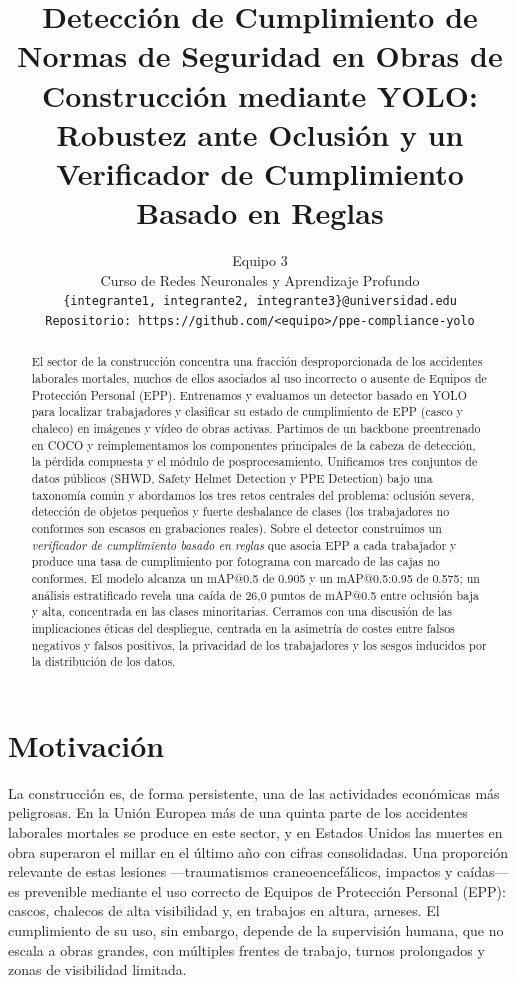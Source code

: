 \documentclass{article}
\title{Detección de Cumplimiento de Normas de Seguridad en Obras de\\
Construcción mediante YOLO: Robustez ante Oclusión y un\\
Verificador de Cumplimiento Basado en Reglas}
\author{%
  Equipo 3 \\
  Curso de Redes Neuronales y Aprendizaje Profundo \\
  \texttt{\{integrante1, integrante2, integrante3\}@universidad.edu} \\
  \texttt{Repositorio: https://github.com/<equipo>/ppe-compliance-yolo}
}
\begin{document}
\maketitle

\begin{abstract}
El sector de la construcción concentra una fracción desproporcionada de los
accidentes laborales mortales, muchos de ellos asociados al uso incorrecto o
ausente de Equipos de Protección Personal (EPP). Entrenamos y evaluamos un
detector basado en YOLO para localizar trabajadores y clasificar su estado de
cumplimiento de EPP (casco y chaleco) en imágenes y vídeo de obras activas.
Partimos de un backbone preentrenado en COCO y reimplementamos los componentes
principales de la cabeza de detección, la pérdida compuesta y el módulo de
posprocesamiento. Unificamos tres conjuntos de datos públicos (SHWD, Safety
Helmet Detection y PPE Detection) bajo una taxonomía común y abordamos los tres
retos centrales del problema: oclusión severa, detección de objetos pequeños y
fuerte desbalance de clases (los trabajadores no conformes son escasos en
grabaciones reales). Sobre el detector construimos un \emph{verificador de
cumplimiento basado en reglas} que asocia EPP a cada trabajador y produce una
tasa de cumplimiento por fotograma con marcado de las cajas no conformes. El
modelo alcanza un mAP@0.5 de 0.905 y un mAP@0.5:0.95 de 0.575; un análisis
estratificado revela una caída de 26{,}0 puntos de mAP@0.5 entre oclusión baja
y alta, concentrada en las clases minoritarias. Cerramos con una discusión de
las implicaciones éticas del despliegue, centrada en la asimetría de costes
entre falsos negativos y falsos positivos, la privacidad de los trabajadores y
los sesgos inducidos por la distribución de los datos.
\end{abstract}

\section{Motivación}

La construcción es, de forma persistente, una de las actividades económicas
más peligrosas. En la Unión Europea más de una quinta parte de los accidentes
laborales mortales se produce en este sector, y en Estados Unidos las muertes
en obra superaron el millar en el último año con cifras consolidadas. Una
proporción relevante de estas lesiones —traumatismos craneoencefálicos,
impactos y caídas— es prevenible mediante el uso correcto de Equipos de
Protección Personal (EPP): cascos, chalecos de alta visibilidad y, en
trabajos en altura, arneses. El cumplimiento de su uso, sin embargo, depende
de la supervisión humana, que no escala a obras grandes, con múltiples frentes
de trabajo, turnos prolongados y zonas de visibilidad limitada.
\end{document}

